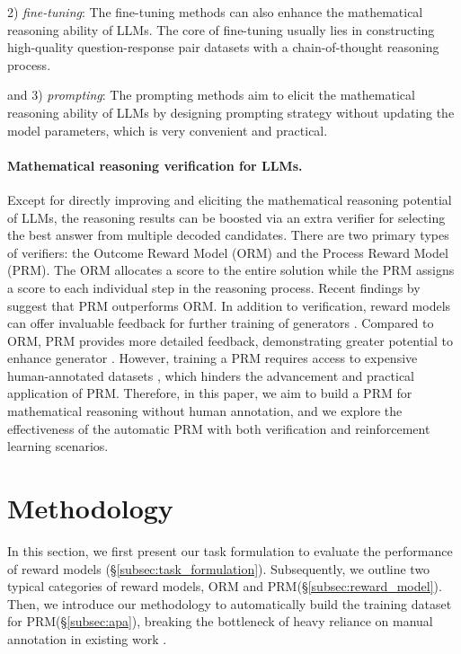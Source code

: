 2) \textit{fine-tuning}: The fine-tuning methods \citep{yu2023metamath,luo2023wizardmath,yue2023mammoth,wang2023making,gou2023tora} can also enhance the mathematical reasoning ability of LLMs. The core of fine-tuning usually lies in constructing high-quality question-response pair datasets with a chain-of-thought reasoning process. 

and 3) \textit{prompting}: The prompting methods \citep{cot,zhang2023cumulative,fu2022complexity,bi2023program} aim to elicit the mathematical reasoning ability of LLMs by designing prompting strategy without updating the model parameters, which is very convenient and practical.

\paragraph{Mathematical reasoning verification for LLMs.} Except for directly improving and eliciting the mathematical reasoning potential of LLMs, the reasoning results can be boosted via an extra verifier for selecting the best answer from multiple decoded candidates. There are two primary types of verifiers: the Outcome Reward Model (ORM) and the Process Reward Model (PRM). The ORM allocates a score to the entire solution while the PRM assigns a score to each individual step in the reasoning process. Recent findings by \citep{lightman2023let} suggest that PRM outperforms ORM. In addition to verification, reward models can offer invaluable feedback for further training of generators \citep{uesato2022solving,pan2023let}. Compared to ORM, PRM provides more detailed feedback, demonstrating greater potential to enhance generator \citep{wu2023fine}. However, training a PRM requires access to expensive human-annotated datasets \citep{uesato2022solving,lightman2023let}, which hinders the advancement and practical application of PRM. Therefore, in this paper, we aim to build a PRM for mathematical reasoning without human annotation, and we explore the effectiveness of the automatic PRM with both verification and reinforcement learning scenarios.

\section{Methodology}
In this section, we first present our task formulation to evaluate the performance of reward models (\S\ref{subsec:task_formulation}).
Subsequently, we outline two typical categories of reward models, ORM and PRM(\S\ref{subsec:reward_model}).
Then, we introduce our methodology to automatically build the training dataset for PRM(\S\ref{subsec:apa}), breaking the bottleneck of heavy reliance on manual annotation in existing work \citep{uesato2022solving,lightman2023let}.

